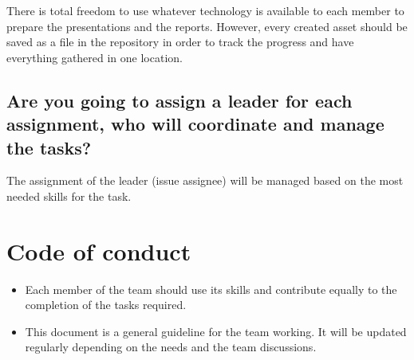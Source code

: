 \documentclass{article}
\begin{document}
There is total freedom to use whatever technology is available to each member to prepare the presentations and the reports. However, every created asset should be saved as a file in the repository in order to track the progress and have everything gathered in one location.


\subsection{Are you going to assign a leader for each assignment, who will coordinate and manage the tasks?}

The assignment of the leader (issue assignee) will be managed based on the most needed skills for the task.

\section{Code of conduct}

\begin{itemize}
    \item Each member of the team should use its skills and contribute equally to the completion of the tasks required.
    \item This document is a general guideline for the team working. It will be updated regularly depending on the needs and the team discussions.
\end{itemize}






%
\end{document}
